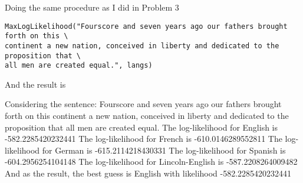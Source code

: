 \documentclass[preprint,12pt]{elsarticle}
\begin{document}
\begin{enumerate}[label=\alph*]
        Doing the same procedure as I did in Problem 3
        \begin{lstlisting}
MaxLogLikelihood("Fourscore and seven years ago our fathers brought forth on this \
continent a new nation, conceived in liberty and dedicated to the proposition that \
all men are created equal.", langs)
        \end{lstlisting}
        And the result is 
        \begin{spverbatim}
Considering the sentence:  Fourscore and seven years ago our 
fathers brought forth on this continent a new nation, conceived 
in liberty and dedicated to the proposition that all men are 
created equal.
The log-likelihood for  English  is  -582.2285420232441
The log-likelihood for  French  is  -610.0146289552811
The log-likelihood for  German  is  -615.2114218430331
The log-likelihood for  Spanish  is  -604.2956254104148
The log-likelihood for  Lincoln-English  is  -587.2208264009482
And as the result, the best guess is  English  with likelihood  
-582.2285420232441 
        \end{spverbatim}
    \end{enumerate}
\end{document}
